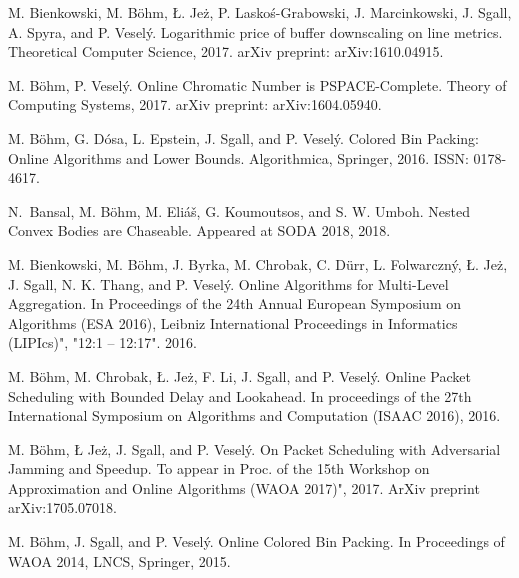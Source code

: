 \begingroup
\let\clearpage\relax
\let\chapter\paragraph
\renewcommand\bibname{Journal papers}
\begin{thebibliography}{99}
\setlength\itemsep{0pt}

M. Bienkowski, M. Böhm, Ł. Jeż, P. Laskoś-Grabowski, J. Marcinkowski, J. Sgall, A. Spyra, and P. Veselý.
\newblock Logarithmic price of buffer downscaling on line metrics.
\newblock Theoretical Computer Science, 2017.
\newblock arXiv preprint: arXiv:1610.04915.

M. Böhm, P. Veselý.
\newblock Online Chromatic Number is PSPACE-Complete.
\newblock Theory of Computing Systems, 2017.
\newblock arXiv preprint: arXiv:1604.05940.

M. Böhm, G. Dósa, L. Epstein, J. Sgall, and P. Veselý.
\newblock Colored Bin Packing: Online Algorithms and Lower Bounds.
\newblock Algorithmica, Springer, 2016.
\newblock ISSN: 0178-4617.

\end{thebibliography}

\renewcommand\bibname{Papers in conference proceedings}
\begin{thebibliography}{99}
\setlength\itemsep{0pt}

N.~Bansal, M. Böhm, M. Eliáš, G. Koumoutsos, and S. W. Umboh.
\newblock Nested Convex Bodies are Chaseable.
\newblock Appeared at SODA 2018, 2018.

M. Bienkowski, M. Böhm, J. Byrka, M. Chrobak, C. Dürr, L. Folwarczný, Ł. Jeż, J. Sgall, N. K. Thang, and P. Veselý.
\newblock Online Algorithms for Multi-Level Aggregation.
\newblock In Proceedings of the 24th Annual European Symposium on Algorithms (ESA 2016), Leibniz International Proceedings in Informatics (LIPIcs)", "12:1 -- 12:17". 2016.

M. Böhm, M. Chrobak, Ł. Jeż, F. Li, J. Sgall, and P. Veselý.
\newblock Online Packet Scheduling with Bounded Delay and Lookahead.
\newblock In proceedings of the 27th International Symposium on Algorithms and Computation (ISAAC 2016), 2016.

M. Böhm, Ł Jeż, J. Sgall, and P. Veselý.
\newblock On Packet Scheduling with Adversarial Jamming and Speedup.
\newblock To appear in Proc. of the 15th Workshop on Approximation and Online Algorithms (WAOA 2017)", 2017.
\newblock ArXiv preprint arXiv:1705.07018.

M. Böhm, J. Sgall, and P. Veselý.
\newblock Online Colored Bin Packing.
\newblock In Proceedings of WAOA 2014, LNCS, Springer, 2015.
\end{thebibliography}

\endgroup